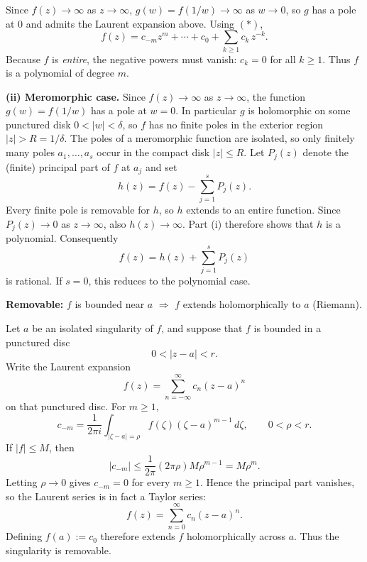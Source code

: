 \begin{solution}
Since $f(z)\to\infty$ as $z\to\infty$, $g(w)=f(1/w)\to\infty$ as $w\to0$,
so $g$ has a pole at $0$ and admits the Laurent expansion above.
Using $(\ast)$,
\[
f(z)=c_{-m}z^m+\cdots+c_0+\sum_{k\ge1} c_k\,z^{-k}.
\]
Because $f$ is \emph{entire}, the negative powers must vanish:
$c_k=0$ for all $k\ge1$.
Thus $f$ is a polynomial of degree $m$.

\medskip
\textbf{(ii) Meromorphic case.}
Since $f(z)\to\infty$ as $z\to\infty$, the function
$g(w)=f(1/w)$ has a pole at $w=0$. In particular $g$ is
holomorphic on some punctured disk $0<|w|<\delta$, so $f$ has
no finite poles in the exterior region $|z|>R=1/\delta$.
The poles of a meromorphic function are isolated, so only finitely many
poles $a_1,\ldots,a_s$ occur in the compact disk $|z|\le R$.
Let $P_j(z)$ denote the (finite) principal part of $f$ at $a_j$ and set
\[
h(z)=f(z)-\sum_{j=1}^{s}P_j(z).
\]
Every finite pole is removable for $h$, so $h$ extends to an entire function.
Since $P_j(z)\to0$ as $z\to\infty$, also $h(z)\to\infty$.
Part (i) therefore shows that $h$ is a polynomial. Consequently
\[
f(z)=h(z)+\sum_{j=1}^{s}P_j(z)
\]
is rational. If $s=0$, this reduces to the polynomial case.

\bigskip
\end{solution}

\begin{problem}[CP-IV-0009]
\label{prob:cp-iv-0009}
\par\noindent\textbullet\quad \textbf{Removable:} $f$ is bounded near $a$ $\Rightarrow$ $f$ extends holomorphically to $a$ (Riemann).
\end{problem}

\begin{solution}
Let \(a\) be an isolated singularity of \(f\), and suppose that \(f\) is bounded in a punctured disc
\[
0<|z-a|<r.
\]
Write the Laurent expansion
\[
f(z)=\sum_{n=-\infty}^{\infty} c_n (z-a)^n
\]
on that punctured disc. For \(m\ge1\),
\[
c_{-m}
=
\frac{1}{2\pi i}\int_{|\zeta-a|=\rho}
f(\zeta)(\zeta-a)^{m-1}\,d\zeta,
\qquad 0<\rho<r.
\]
If \(|f|\le M\), then
\[
|c_{-m}|
\le
\frac{1}{2\pi}(2\pi\rho)M\rho^{m-1}
=
M\rho^m.
\]
Letting \(\rho\to0\) gives \(c_{-m}=0\) for every \(m\ge1\). Hence the principal part vanishes, so the Laurent series is in fact a Taylor series:
\[
f(z)=\sum_{n=0}^{\infty} c_n(z-a)^n.
\]
Defining \(f(a):=c_0\) therefore extends \(f\) holomorphically across \(a\). Thus the singularity is removable.
\end{solution}


